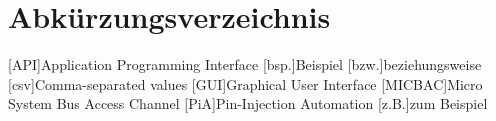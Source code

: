 \section*{Abkürzungsverzeichnis}
\begin{acronym}[MICBAC]
[API]{Application Programming Interface}
[bsp.]{Beispiel}
[bzw.]{beziehungsweise}
[csv]{Comma-separated values}
[GUI]{Graphical User Interface}
[MICBAC]{Micro System Bus Access Channel}
[PiA]{Pin-Injection Automation}
[z.B.]{zum Beispiel}
\end{acronym}
